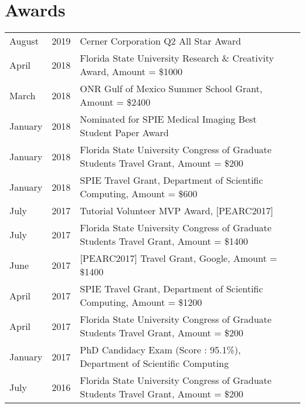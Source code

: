 \documentclass[]{template}
\begin{document}
\section{Awards} 
\sectionsep
\begin{tabular}{llll}
\textbullet{} August & 2019	  & Cerner Corporation Q2 All Star Award \\

\textbullet{} April & 2018	  & Florida State University Research \& Creativity Award, Amount = \$1000    \\

\textbullet{} March &2018	  & ONR Gulf of Mexico Summer School Grant, Amount = \$2400    \\

\textbullet{} January& 2018	  & Nominated for SPIE Medical Imaging Best Student Paper Award  \\

\textbullet{} January& 2018	  & Florida State University Congress of Graduate Students Travel Grant, Amount = \$200   \\
 
\textbullet{} January &2018      &  SPIE Travel Grant, Department of Scientific Computing, Amount = \$600\\

\textbullet{} July &2017      & Tutorial Volunteer MVP Award, [PEARC2017]\\

\textbullet{} July& 2017	  & Florida State University Congress of Graduate Students Travel Grant, Amount = \$1400\\

\textbullet{} June& 2017	  & [PEARC2017] Travel Grant, Google, Amount = \$1400\\

\textbullet{} April& 2017	  & SPIE Travel Grant, Department of Scientific Computing, Amount = \$1200\\

\textbullet{} April& 2017	  & Florida State University Congress of Graduate Students Travel Grant, Amount = \$200  \\

\textbullet{} January& 2017	  & PhD Candidacy Exam (Score : 95.1\%), Department of Scientific Computing  \\

\textbullet{} July& 2016	  & Florida State University Congress of Graduate Students Travel Grant, Amount = \$200  \\


\end{tabular}
\end{document}
